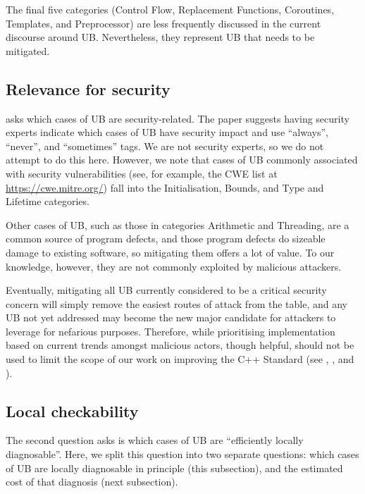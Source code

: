 The final five categories (Control Flow, Replacement Functions, Coroutines, Templates, and Preprocessor) are less frequently discussed in the current discourse around UB. Nevertheless, they represent UB that needs to be mitigated.

\subsection{Relevance for security}

\cite{P3656R1} asks which cases of UB are security-related. The paper suggests having security experts indicate which cases of UB have security impact and use ``always'', ``never'', and ``sometimes'' tags. We are not security experts, so we do not attempt to do this here. However, we note that cases of UB commonly associated with security vulnerabilities (see, for example, the CWE list at \url{https://cwe.mitre.org/}) fall into the Initialisation, Bounds, and Type and Lifetime categories. 

Other cases of UB, such as those in categories Arithmetic and Threading, are a common source of program defects, and those program defects do sizeable damage to existing software, so mitigating them offers a lot of value. To our knowledge, however, they are not commonly exploited by malicious attackers.

Eventually, mitigating all UB currently considered to be a critical security concern will simply remove the easiest routes of attack from the table, and any UB not yet addressed may become the new major candidate for attackers to leverage for nefarious purposes.  Therefore, while prioritising implementation based on current trends amongst malicious actors, though helpful, should not be used to limit the scope of our work on improving the C++ Standard (see \cite{Sutter2024}, \cite{P3500R1}, and \cite{P3578R0}).

\subsection{Local checkability}
\label{locally}

The second question \cite{P3656R1} asks is which cases of UB are ``efficiently locally diagnosable''. Here, we split this question into two separate questions: which cases of UB are locally diagnosable in principle (this subsection), and the estimated cost of that diagnosis (next subsection).

